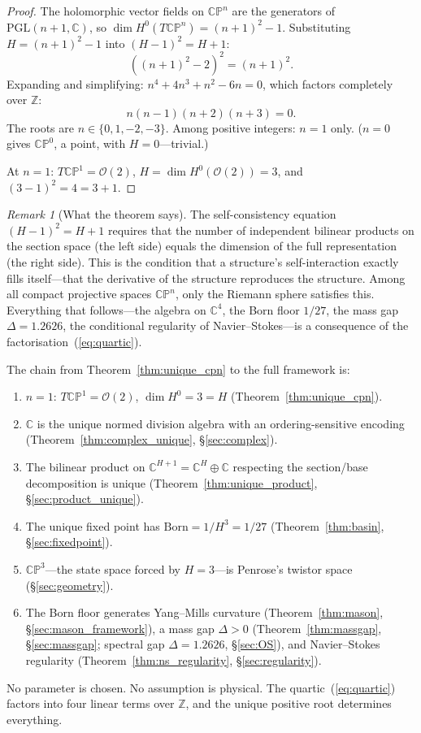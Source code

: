 \documentclass[11pt,a4paper]{article}
\theoremstyle{definition}
\theoremstyle{remark}
\newtheorem{remark}[theorem]{Remark}
\newcommand{\CP}{\mathbb{CP}}
\newcommand{\C}{\mathbb{C}}
\newcommand{\Z}{\mathbb{Z}}
\begin{document}
\begin{proof}
The holomorphic vector fields on $\CP^n$ are the generators of $\mathrm{PGL}(n+1,\C)$, so $\dim H^0(T\CP^n)=(n+1)^2-1$. Substituting $H=(n+1)^2-1$ into $(H-1)^2=H+1$:
\[
((n+1)^2-2)^2=(n+1)^2.
\]
Expanding and simplifying: $n^4+4n^3+n^2-6n=0$, which factors completely over $\Z$:
\begin{equation}\label{eq:quartic}
n(n-1)(n+2)(n+3)=0.
\end{equation}
The roots are $n\in\{0,1,-2,-3\}$. Among positive integers: $n=1$ only. ($n=0$ gives $\CP^0$, a point, with $H=0$---trivial.)

At $n=1$: $T\CP^1=\mathcal{O}(2)$, $H=\dim H^0(\mathcal{O}(2))=3$, and $(3-1)^2=4=3+1$.
\end{proof}

\begin{remark}[What the theorem says]\label{rem:unique_space}
The self-consistency equation $(H-1)^2=H+1$ requires that the number of independent bilinear products on the section space (the left side) equals the dimension of the full representation (the right side). This is the condition that a structure's self-interaction exactly fills itself---that the derivative of the structure reproduces the structure. Among all compact projective spaces $\CP^n$, only the Riemann sphere satisfies this. Everything that follows---the algebra on $\C^4$, the Born floor $1/27$, the mass gap $\Delta=1.2626$, the conditional regularity of Navier--Stokes---is a consequence of the factorisation~(\ref{eq:quartic}).
\end{remark}

The chain from Theorem~\ref{thm:unique_cpn} to the full framework is:
\begin{enumerate}[nosep]
\item $n=1$: $T\CP^1=\mathcal{O}(2)$, $\dim H^0=3=H$ (Theorem~\ref{thm:unique_cpn}).
\item $\C$ is the unique normed division algebra with an ordering-sensitive encoding (Theorem~\ref{thm:complex_unique}, \S\ref{sec:complex}).
\item The bilinear product on $\C^{H+1}=\C^H\oplus\C$ respecting the section/base decomposition is unique (Theorem~\ref{thm:unique_product}, \S\ref{sec:product_unique}).
\item The unique fixed point has $\mathrm{Born}=1/H^3=1/27$ (Theorem~\ref{thm:basin}, \S\ref{sec:fixedpoint}).
\item $\CP^3$---the state space forced by $H=3$---is Penrose's twistor space (\S\ref{sec:geometry}).
\item The Born floor generates Yang--Mills curvature (Theorem~\ref{thm:mason}, \S\ref{sec:mason_framework}), a mass gap $\Delta>0$ (Theorem~\ref{thm:massgap}, \S\ref{sec:massgap}; spectral gap $\Delta=1.2626$, \S\ref{sec:OS}), and Navier--Stokes regularity (Theorem~\ref{thm:ns_regularity}, \S\ref{sec:regularity}).
\end{enumerate}
No parameter is chosen. No assumption is physical. The quartic~(\ref{eq:quartic}) factors into four linear terms over $\Z$, and the unique positive root determines everything.
\end{document}
